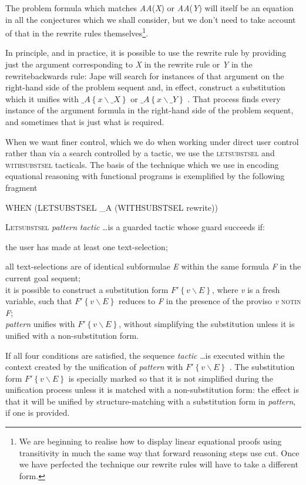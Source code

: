 \documentclass[11pt]{book}
\newcommand{\tab}{\hspace{5mm}}
\begin{document}
The problem formula which matches \textit{AA}(\textit{X}) or \textit{AA}(\textit{Y}) will itself be an equation in all the conjectures which we shall consider, but we don't need to take account of that in the rewrite rules themselves\footnote{We are beginning to realise how to display linear equational proofs using transitivity in much the same way that forward reasoning steps use cut. Once we have perfected the technique our rewrite rules will have to take a different form.}.


In principle, and in practice, it is possible to use the rewrite rule by providing just the argument corresponding to \textit{X} in the rewrite rule or \textit{Y} in the rewritebackwards rule: Jape will search for instances of that argument on the right-hand side of the problem sequent and, in effect, construct a substitution which it unifies with $\_{}A\left\{ x\backslash \_{}X\right\} $ or $\_{}A\left\{ x\backslash \_{}Y\right\} $ . That process finds every instance of the argument formula in the right-hand side of the problem sequent, and sometimes that is just what is required.


When we want finer control, which we do when working under direct user control rather than via a search controlled by a tactic, we use the \textsc{letsubstsel} and \textsc{withsubstsel} tacticals. The basis of the technique which we use in encoding equational reasoning with functional programs is exemplified by the following fragment

WHEN (LETSUBSTSEL \_A (WITHSUBSTSEL rewrite))


\textsc{Letsubstsel} \textit{pattern} \textit{tactic} \dots  is a guarded tactic whose guard succeeds if:


{\textbullet}\tab the user has made at least one text-selection;


{\textbullet}\tab all text-selections are of identical subformulae \textit{E} within the same formula \textit{F} in the current goal sequent;\\
{\textbullet}\tab it is possible to construct a substitution form $F' \left\{ v\backslash E\right\} $, where \textit{v} is a fresh variable, such that $F' \left\{ v\backslash E\right\} $ reduces to \textit{F} in the presence of the proviso \textit{v} \textsc{notin} \textit{F};\\
{\textbullet}\tab \textit{pattern} unifies with $F' \left\{ v\backslash E\right\} $, without simplifying the substitution unless it is unified with a non-substitution form.


If all four conditions are satisfied, the sequence \textit{tactic} \dots  is executed within the context created by the unification of \textit{pattern} with $F' \left\{ v\backslash E\right\} $ . The substitution form $F' \left\{ v\backslash E\right\} $ is specially marked so that it is not simplified during the unification process unless it is matched with a non-substitution form: the effect is that it will be unified by structure-matching with a substitution form in \textit{pattern}, if one is provided.
\end{document}

